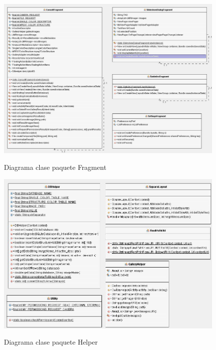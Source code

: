 \begin{figure}[H] %
\centering
\includegraphics[scale=0.6]{imagenes/diagrama3.jpg}  %
\label{diagrama3}
\caption{Diagrama clase paquete Fragment}
\end{figure}

\begin{figure}[H] %
\centering
\includegraphics[scale=0.6]{imagenes/diagrama4.jpg}  %
\label{diagrama4}
\caption{Diagrama clase paquete Helper}
\end{figure}

